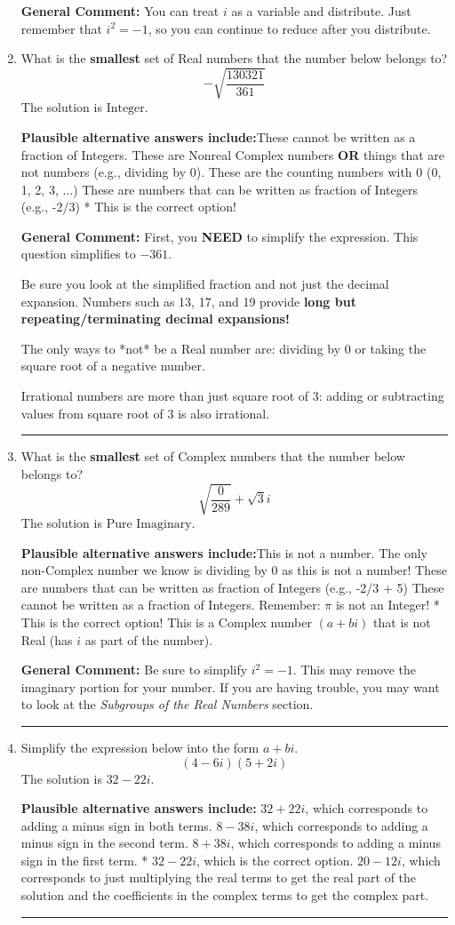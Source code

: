 \documentclass{extbook}[14pt]
\newcommand{\litem}[1]{\item #1

\rule{\textwidth}{0.4pt}}
\begin{document}
\begin{enumerate}
{\textbf{General Comment:} You can treat $i$ as a variable and distribute. Just remember that $i^2=-1$, so you can continue to reduce after you distribute.
}
\litem{
What is the \textbf{smallest} set of Real numbers that the number below belongs to?
\[ -\sqrt{\frac{130321}{361}} \]The solution is \( \text{Integer} \).\begin{enumerate}[label=\Alph*.]
\textbf{Plausible alternative answers include:}These cannot be written as a fraction of Integers.
These are Nonreal Complex numbers \textbf{OR} things that are not numbers (e.g., dividing by 0).
These are the counting numbers with 0 (0, 1, 2, 3, ...)
These are numbers that can be written as fraction of Integers (e.g., -2/3)
* This is the correct option!
\end{enumerate}

\textbf{General Comment:} First, you \textbf{NEED} to simplify the expression. This question simplifies to $-361$. 
 
 Be sure you look at the simplified fraction and not just the decimal expansion. Numbers such as 13, 17, and 19 provide \textbf{long but repeating/terminating decimal expansions!} 
 
 The only ways to *not* be a Real number are: dividing by 0 or taking the square root of a negative number. 
 
 Irrational numbers are more than just square root of 3: adding or subtracting values from square root of 3 is also irrational.
}
\litem{
What is the \textbf{smallest} set of Complex numbers that the number below belongs to?
\[ \sqrt{\frac{0}{289}}+\sqrt{3}i \]The solution is \( \text{Pure Imaginary} \).\begin{enumerate}[label=\Alph*.]
\textbf{Plausible alternative answers include:}This is not a number. The only non-Complex number we know is dividing by 0 as this is not a number!
These are numbers that can be written as fraction of Integers (e.g., -2/3 + 5)
These cannot be written as a fraction of Integers. Remember: $\pi$ is not an Integer!
* This is the correct option!
This is a Complex number $(a+bi)$ that is not Real (has $i$ as part of the number).
\end{enumerate}

\textbf{General Comment:} Be sure to simplify $i^2 = -1$. This may remove the imaginary portion for your number. If you are having trouble, you may want to look at the \textit{Subgroups of the Real Numbers} section.
}
\litem{
Simplify the expression below into the form $a+bi$.
\[ (4 - 6 i)(5 + 2 i) \]The solution is \( 32 - 22 i \).\begin{enumerate}[label=\Alph*.]
\textbf{Plausible alternative answers include:} $32 + 22 i$, which corresponds to adding a minus sign in both terms.
 $8 - 38 i$, which corresponds to adding a minus sign in the second term.
 $8 + 38 i$, which corresponds to adding a minus sign in the first term.
* $32 - 22 i$, which is the correct option.
 $20 - 12 i$, which corresponds to just multiplying the real terms to get the real part of the solution and the coefficients in the complex terms to get the complex part.
\end{enumerate}

}
\end{enumerate}
\end{document}
